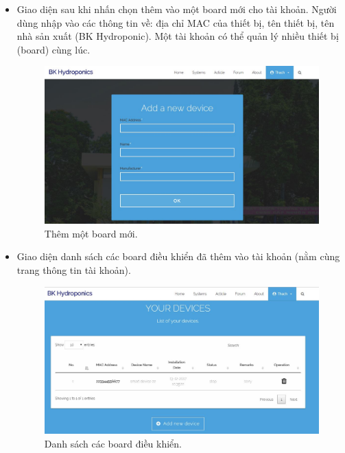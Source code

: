 \documentclass[a4paper,12pt,oneside]{article}
\begin{document}
\begin{itemize}
\item Giao diện sau khi nhấn chọn thêm vào một board mới cho tài khoản. Người dùng nhập vào các thông tin về: địa chỉ MAC của thiết bị, tên thiết bị, tên nhà sản xuất (BK Hydroponic). Một tài khoản có thể quản lý nhiều thiết bị (board) cùng lúc.
\begin{figure}[H]
\centering
\includegraphics[scale=.5]{hinh/web_add_device.jpg}
\caption{Thêm một board mới.}
\end{figure}

\item Giao diện danh sách các board điều khiển đã thêm vào tài khoản (nằm cùng trang thông tin tài khoản).
\begin{figure}[H]
\centering
\includegraphics[scale=.45]{hinh/web_devices.jpg}
\caption{Danh sách các board điều khiển.}
\end{figure}


\end{itemize}
\end{document}
